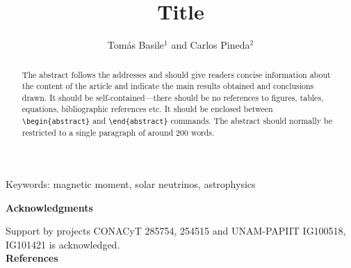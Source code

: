 \documentclass[12pt]{Template/iopart}
\newcommand\keywords[1]{Keywords: #1}
\begin{document}
\title[Title]{Title}

\author{Tomás Basile$^1$ and Carlos Pineda$^2$}

\address{$^1$ Facultad de Ciencias. Universidad Nacional Autónoma de México, Ciudad de México 01000, Mexico}
\address{$^2$ Instituto de Física, Universidad Nacional Autónoma de México, Ciudad de México 01000, México}

\begin{abstract}
The abstract follows the addresses and
should give readers concise information about the content 
of the article and indicate the main results obtained and conclusions 
drawn. It should be self-contained---there should be no references to 
figures, tables, equations, bibliographic references etc.  It should be enclosed between \verb"\begin{abstract}"
and \verb"\end{abstract}" commands.  The abstract should normally be restricted 
to a single paragraph of around 200 words.
\end{abstract}
\keywords{magnetic moment, solar neutrinos, astrophysics} \\
\submitto{\PS}
\maketitle








\newpage
\appendix




\textbf{Acknowledgments}

Support by projects CONACyT 285754, 254515 and UNAM-PAPIIT IG100518, IG101421 is
acknowledged.  \\


\textbf{References}


\end{document}
